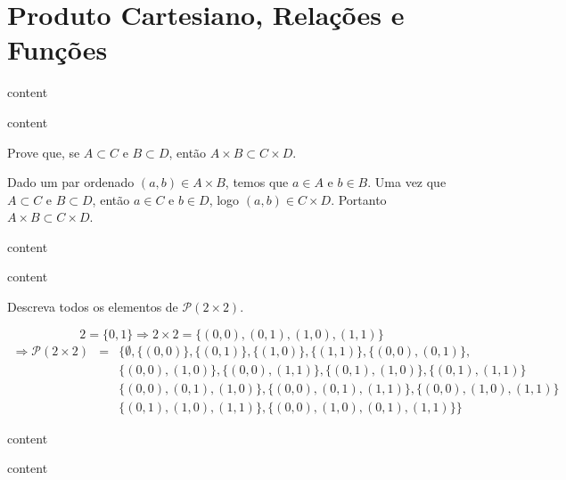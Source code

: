 \chapter{Produto Cartesiano, Relações e Funções}

\setcounter{ex}{0}

\begin{exercicio}
	content
\end{exercicio}
\begin{solucao}
	content
\end{solucao}

\begin{exercicio}
	Prove que, se $A\subset C$ e $B\subset D$, então $A\times B\subset C\times D$.
\end{exercicio}
\begin{solucao}
	Dado um par ordenado $(a,b)\in A\times B$, temos que $a\in A$ e $b\in B$. Uma vez que $A\subset C$ e $B\subset D$, então $a\in C$ e $b\in D$, logo $(a,b)\in C\times D$. Portanto $A\times B\subset C\times D$.
\end{solucao}

\begin{exercicio}
	content
\end{exercicio}
\begin{solucao}
	content
\end{solucao}

\begin{exercicio}
	Descreva todos os elementos de $\mathcal{P}(2\times 2)$.
\end{exercicio}
\begin{solucao}
	$$2=\{0,1\}\Rightarrow 2\times2=\{(0,0),(0,1),(1,0),(1,1)\}$$
	\begin{eqnarray*}
		\Rightarrow\mathcal{P}(2\times 2)&=&\{\emptyset,\{(0,0)\},\{(0,1)\},\{(1,0)\},\{(1,1)\},\{(0,0),(0,1)\}, \\
		&&\{(0,0),(1,0)\},\{(0,0),(1,1)\},\{(0,1),(1,0)\},\{(0,1),(1,1)\} \\
		&&\{(0,0),(0,1),(1,0)\},\{(0,0),(0,1),(1,1)\},\{(0,0),(1,0),(1,1)\} \\
		&&\{(0,1),(1,0),(1,1)\},\{(0,0),(1,0),(0,1),(1,1)\}\}
	\end{eqnarray*}
\end{solucao}

\begin{exercicio}
	content
\end{exercicio}
\begin{solucao}
	content
\end{solucao}

